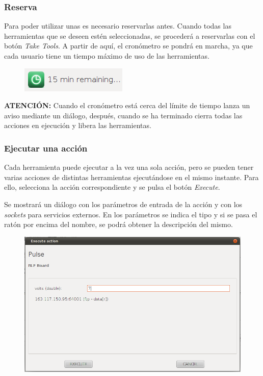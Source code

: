 \subsubsection*{Reserva}
Para poder utilizar unas es necesario reservarlas antes. Cuando todas 
las herramientas que se deseen estén seleccionadas, se procederá a 
reservarlas con el botón \textit{Take Tools}. A partir de aquí, el 
cronómetro se pondrá en marcha, ya que cada usuario tiene un tiempo 
máximo de uso de las herramientas.

\begin{figure}[h]
	\centering
	\includegraphics[scale=0.8]{images/user/timer.png}
\end{figure}

\textbf{ATENCIÓN:} Cuando el cronómetro está cerca del límite de 
tiempo lanza un aviso mediante un diálogo, después, cuando se ha 
terminado cierra todas las acciones en ejecución y libera las 
herramientas.

\subsubsection*{Ejecutar una acción}
Cada herramienta puede ejecutar a la vez una sola acción, pero se 
pueden tener varias acciones de distintas herramientas ejecutándose en 
el mismo instante. Para ello, selecciona la acción correspondiente y 
se pulsa el botón \textit{Execute}.

Se mostrará un diálogo con los parámetros de entrada de la acción y 
con los \emph{sockets} para servicios externos. En los parámetros se indica 
el tipo y si se pasa el ratón por encima del nombre, se podrá obtener 
la descripción del mismo.

\begin{figure}[H]
	\centering
	\includegraphics[scale=0.4]{images/user/inparams.png}
\end{figure}


